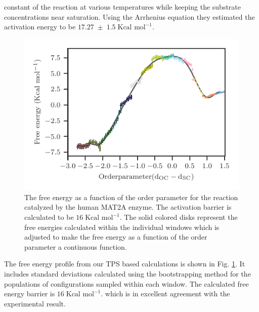 \documentclass[journal=jpcbfk,manuscript=article,layout=traditional]{achemso}
\begin{document}
constant of the reaction at various temperatures while keeping the 
substrate concentrations near saturation. Using the Arrhenius equation 
they estimated the activation energy to be $17.27\;\pm\;1.5\;
\text{Kcal mol}^{-1}$.
\begin{figure}
\includegraphics[scale=1.0]{figures/mat2a-fenergy.pdf}
\caption{The free energy as a function of the order 
parameter for the reaction catalyzed
by the human MAT2A enzyme. The activation barrier is 
calculated to be $16\;\text{Kcal mol}^{-1}$. The solid colored disks represent the free energies 
calculated within the individual windows which is adjusted to make the free energy as a function 
of the order parameter a continuous function.}
\label{fig:mat2a-fenergy}
\end{figure}
The free energy profile from our TPS based calculations is shown in 
Fig. \ref{fig:mat2a-fenergy}. It includes standard deviations calculated 
using the bootstrapping method for the populations of configurations 
sampled within each window. \cite{Hub10JChemTheoryComput6p3713}
The calculated free energy barrier is $16\;\text{Kcal mol}^{-1}$.
which is in excellent agreement with the experimental result.  
\end{document}
